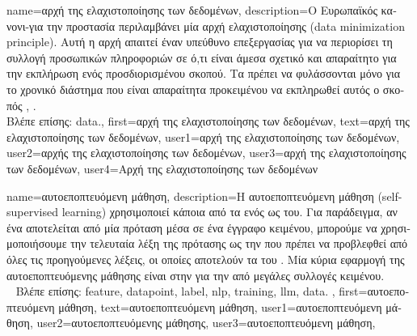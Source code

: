 {name={\foreignlanguage{greek}{αρχή της ελαχιστοποίησης των δεδομένων}},
	description={\foreignlanguage{greek}{Ο Ευρωπαϊκός κανονι- για την 
		προστασία}  
		\foreignlanguage{greek}{περιλαμβάνει μία αρχή ελαχιστο\-ποί\-ησης}  (data minimization principle). 
		\foreignlanguage{greek}{Αυτή η αρχή απαιτεί έναν υπεύθυνο επεξεργασίας}  \foreignlanguage{greek}{για να 
		περιορίσει τη συλλογή προσωπικών πληροφοριών σε ό,τι είναι άμεσα σχετικό και απαραίτητο για την εκπλήρωση ενός 
		προσδιορισμένου σκοπού. Τα}  \foreignlanguage{greek}{πρέπει να φυλάσσονται μόνο για το χρονικό διάστημα 
		που είναι απαραίτητα προκειμένου να εκπληρωθεί αυτός ο σκοπός} 
		\cite[\foreignlanguage{greek}{Άρθρο} 5(1)(c)]{GDPR2016}, \cite{EURegulation2018}.
		\\
		\foreignlanguage{greek}{Βλέπε επίσης:} \gls{data}.}, 
	first={\foreignlanguage{greek}{αρχή της ελαχιστοποίησης των δεδομένων}},
	text={\foreignlanguage{greek}{αρχή της ελαχιστοποίησης των δεδομένων}},
	user1={\foreignlanguage{greek}{αρχή της ελαχιστοποίησης των δεδομένων}}, %
  	user2={\foreignlanguage{greek}{αρχής της ελαχιστοποίησης των δεδομένων}}, %
	user3={\foreignlanguage{greek}{αρχή της ελαχιστοποίησης των δεδομένων}}, %
	user4={\foreignlanguage{greek}{Αρχή της ελαχιστοποίησης των δεδομένων}} %
}

{name={\foreignlanguage{greek}{αυτοεποπτευόμενη μάθηση}},
 	description={\foreignlanguage{greek}{Η αυτοεποπτευόμενη μάθηση} 
		(self-supervised learning) \foreignlanguage{greek}{χρησιμοποιεί κάποια από τα}  \foreignlanguage{greek}{ενός} 
		 \foreignlanguage{greek}{ως}  \foreignlanguage{greek}{του. Για παράδειγμα, αν ένα} 
		 \foreignlanguage{greek}{αποτελείται από μία πρόταση μέσα σε ένα έγγραφο κειμένου, μπορούμε να 
		χρησιμοποιήσουμε την τελευταία λέξη της πρότασης ως την}  \foreignlanguage{greek}{που πρέπει να 
		προβλεφθεί από όλες τις προηγούμενες λέξεις, οι οποίες αποτελούν τα}  \foreignlanguage{greek}{του}
		. \foreignlanguage{greek}{Μία κύρια εφαρμογή της αυτοεποπτευόμενης μάθησης είναι στην}
		 \foreignlanguage{greek}{για την}   \foreignlanguage{greek}{από μεγάλες συλλογές} 
		 \foreignlanguage{greek}{κειμένου}. 
		\\ 
      		\foreignlanguage{greek}{Βλέπε επίσης:} \gls{feature}, \gls{datapoint}, \gls{label}, \gls{nlp}, \gls{training}, \gls{llm}, \gls{data}. }, 
   	first={\foreignlanguage{greek}{αυτοεποπτευόμενη μάθηση}}, 
   	text={\foreignlanguage{greek}{αυτοεποπτευόμενη μάθηση}},
	user1={\foreignlanguage{greek}{αυτοεποπτευόμενη μάθηση}}, %
  	user2={\foreignlanguage{greek}{αυτοεποπτευόμενης μάθησης}}, %
	user3={\foreignlanguage{greek}{αυτοεποπτευόμενη μάθηση}}, %
}

